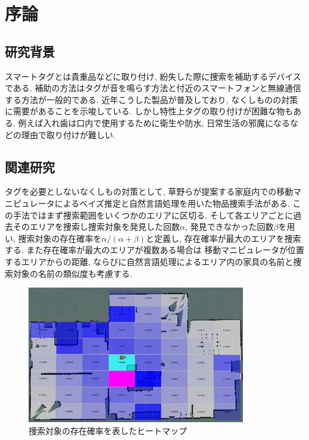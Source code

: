 \chapter{序論}

\section{研究背景}
スマートタグとは貴重品などに取り付け, 紛失した際に捜索を補助するデバイスである. 
補助の方法はタグが音を鳴らす方法と付近のスマートフォンと無線通信する方法が一般的である. 
近年こうした製品が普及しており, なくしものの対策に需要があることを示唆している. 
しかし特性上タグの取り付けが困難な物もある. 
例えば入れ歯は口内で使用するために衛生や防水, 日常生活の邪魔になるなどの理由で取り付けが難しい. 

\section{関連研究}
タグを必要としないなくしもの対策として, 草野らが提案する家庭内での移動マニピュレータによるベイズ推定と自然言語処理を用いた物品捜索手法\cite{kusano}がある. 
この手法ではまず捜索範囲をいくつかのエリアに区切る. 
そして各エリアごとに過去そのエリアを捜索し捜索対象を発見した回数$\alpha$, 発見できなかった回数$\beta$を用い, 
捜索対象の存在確率を$ \alpha / (\alpha + \beta)$と定義し, 存在確率が最大のエリアを捜索する. 
また存在確率が最大のエリアが複数ある場合は
移動マニピュレータが位置するエリアからの距離, 
ならびに自然言語処理によるエリア内の家具の名前と捜索対象の名前の類似度も考慮する. 

\begin{figure}[H]
    \begin{center}
        \includegraphics[width=0.8\linewidth]{figs/kusano.jpg}
        \caption{捜索対象の存在確率を表したヒートマップ}%
        \label{fig:kusano}
    \end{center}
\end{figure}

